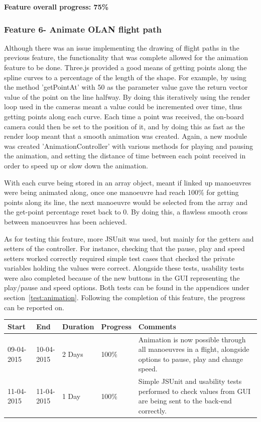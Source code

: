\textbf{Feature overall progress: 75\%}

\subsubsection{Feature 6- Animate OLAN flight path}
Although there was an issue implementing the drawing of flight paths in the previous feature, the functionality that was complete allowed for the animation feature to be done. Three.js provided a good means of getting points along the spline curves to a percentage of the length of the shape. For example, by using the method 'getPointAt' with 50 as the parameter value gave the return vector value of the point on the line halfway. By doing this iteratively using the render loop used in the cameras meant a value could be incremented over time, thus getting points along each curve. Each time a point was received, the on-board camera could then be set to the position of it, and by doing this as fast as the render loop meant that a smooth animation was created. Again, a new module was created 'AnimationController' with various methods for playing and pausing the animation, and setting the distance of time between each point received in order to speed up or slow down the animation.

With each curve being stored in an array object, meant if linked up manoeuvres were being animated along, once one manoeuvre had reach 100\% for getting points along its line, the next manoeuvre would be selected from the array and the get-point percentage reset back to 0. By doing this, a flawless smooth cross between manoeuvres has been achieved.

As for testing this feature, more JSUnit was used, but mainly for the getters and setters of the controller. For instance, checking that the pause, play and speed setters worked correctly required simple test cases that checked the private variables holding the values were correct. Alongside these tests, usability tests were also completed because of the new buttons in the GUI representing the play/pause and speed options. Both tests can be found in the appendices under section~\ref{test:animation}. Following the completion of this feature, the progress can be reported on. 

\begin{table}[h]
\begin{tabular}{|l|l|l|l|p{7cm}|}
\hline
\textbf{Start} & \textbf{End} & \textbf{Duration} & \textbf{Progress} & \textbf{Comments}                                                                                                     \\ \hline
09-04-2015     & 10-04-2015   & 2 Days            & 100\%             &  Animation is now possible through all manoeuvres in a flight, alongside options to pause, play and change speed.\\ \hline
11-04-2015     & 11-04-2015   & 1 Day            & 100\%             &  Simple JSUnit and usability tests performed to check values from GUI are being sent to the back-end correctly.\\ \hline
\end{tabular}
\end{table}

